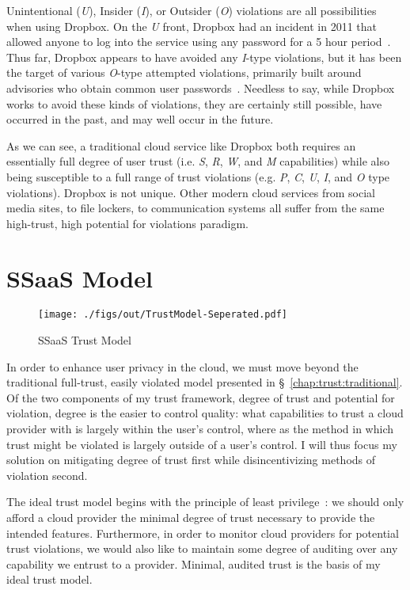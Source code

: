 Unintentional (\emph{U}), Insider (\emph{I}), or Outsider (\emph{O})
violations are all possibilities when using Dropbox. On the \emph{U}
front, Dropbox had an incident in 2011 that allowed anyone to log into
the service using any password for a 5 hour
period~\cite{dropbox-authbug}. Thus far, Dropbox appears to have
avoided any \emph{I}-type violations, but it has been the target of
various \emph{O}-type attempted violations, primarily built around
advisories who obtain common user
passwords~\cite{dropbox-passwords}. Needless to say, while Dropbox
works to avoid these kinds of violations, they are certainly still
possible, have occurred in the past, and may well occur in the future.

As we can see, a traditional cloud service like Dropbox both requires
an essentially full degree of user trust (i.e. \emph{S}, \emph{R},
\emph{W}, and \emph{M} capabilities) while also being susceptible to a
full range of trust violations (e.g. \emph{P}, \emph{C}, \emph{U},
\emph{I}, and \emph{O} type violations). Dropbox is not unique. Other
modern cloud services from social media sites, to file lockers, to
communication systems all suffer from the same high-trust, high
potential for violations paradigm.

\section{SSaaS Model}
\label{chap:trust:ssaas}

\begin{figure}[t]
  \centering
  \texttt{[image: ./figs/out/TrustModel-Seperated.pdf]}
  \caption{SSaaS Trust Model}
  \label{fig:trust-ssaas}
\end{figure}

In order to enhance user privacy in the cloud, we must move beyond the
traditional full-trust, easily violated model presented in
\S~\ref{chap:trust:traditional}. Of the two components of my trust
framework, degree of trust and potential for violation, degree is the
easier to control quality: what capabilities to trust a cloud provider
with is largely within the user's control, where as the method in
which trust might be violated is largely outside of a user's
control. I will thus focus my solution on mitigating degree of trust
first while disincentivizing methods of violation second.

The ideal trust model begins with the principle of least
privilege~\cite{saltzer1975}: we should only afford a cloud provider
the minimal degree of trust necessary to provide the intended
features. Furthermore, in order to monitor cloud providers for
potential trust violations, we would also like to maintain some degree
of auditing over any capability we entrust to a provider. Minimal,
audited trust is the basis of my ideal trust model.

